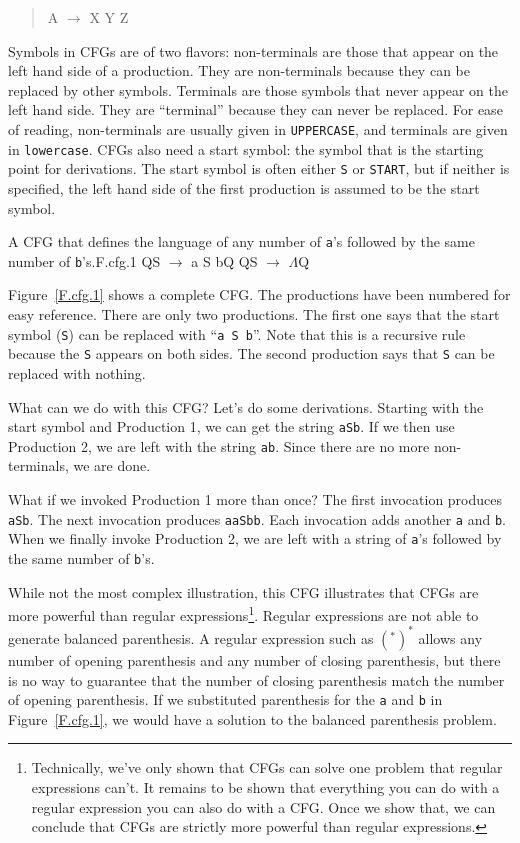 \documentclass[letterpaper,12pt,openany,reqno]{book}%
\newcommand{\code}[1] {\lstinline[breaklines=yes,breakatwhitespace=yes]{#1}}
\newcommand{\cfgprod}[2] {{\ttfamily #1} $\rightarrow$ {\ttfamily #2}}
\newcommand{\cfgindentprod}[2] {\begin{quote} {\ttfamily #1} $\rightarrow$ {\ttfamily #2} \end{quote}}
\begin{document}
\cfgindentprod{A}{X Y Z}

Symbols in CFGs are of two flavors: non-terminals are those that appear on the left hand side of a production. They are non-terminals because they can be replaced by other symbols. Terminals are those symbols that never appear on the left hand side. They are ``terminal'' because they can never be replaced. For ease of reading, non-terminals are usually given in \texttt{UPPERCASE}, and terminals are given in \texttt{lowercase}. CFGs also need a start symbol: the symbol that is the starting point for derivations. The start symbol is often either \code{S} or \code{START}, but if neither is specified, the left hand side of the first production is assumed to be the start symbol.

\begin{cfg}{A CFG that defines the language of any number of \code{a}'s followed by the same number of \code{b}'s.}{F.cfg.1}
Q\cfgprod{S}{a S b}Q
Q\cfgprod{S}{$\Lambda$}Q
\end{cfg}

Figure~\ref{F.cfg.1} shows a complete CFG. The productions have been numbered for easy reference. There are only two productions. The first one says that the start symbol (\code{S}) can be replaced with ``\code{a S b}''. Note that this is a recursive rule because the \code{S} appears on both sides. The second production says that \code{S} can be replaced with nothing.

What can we do with this CFG? Let's do some derivations. Starting with the start symbol and Production 1, we can get the string \code{aSb}. If we then use Production 2, we are left with the string \code{ab}. Since there are no more non-terminals, we are done.

What if we invoked Production 1 more than once? The first invocation produces \code{aSb}. The next invocation produces \code{aaSbb}. Each invocation adds another \code{a} and \code{b}. When we finally invoke Production 2, we are left with a string of \code{a}'s followed by the same number of \code{b}'s.

While not the most complex illustration, this CFG illustrates that CFGs are more powerful than regular expressions\footnote{Technically, we've only shown that CFGs can solve one problem that regular expressions can't. It remains to be shown that everything you can do with a regular expression you can also do with a CFG. Once we show that, we can conclude that CFGs are strictly more powerful than regular expressions.}. Regular expressions are not able to generate balanced parenthesis. A regular expression such as $(^*)^*$ allows any number of opening parenthesis and any number of closing parenthesis, but there is no way to guarantee that the number of closing parenthesis match the number of opening parenthesis. If we substituted parenthesis for the \code{a} and \code{b} in Figure~\ref{F.cfg.1}, we would have a solution to the balanced parenthesis problem.
\end{document}
